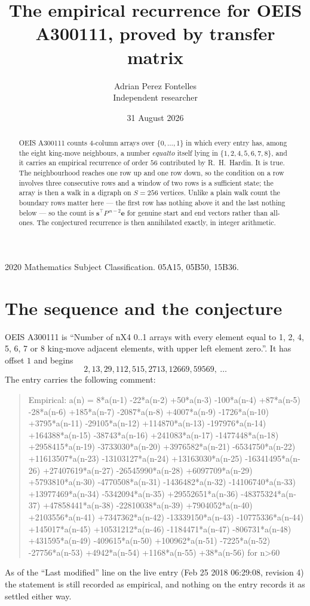 \documentclass[11pt,a4paper]{article}
\title{The empirical recurrence for OEIS A300111, proved by transfer matrix}
\author{Adrian Perez Fontelles\\ \small Independent researcher}
\date{31 August 2026}
\theoremstyle{plain}
\theoremstyle{definition}
\begin{document}
\maketitle

\begin{abstract}
OEIS A300111 counts $4$-column arrays over $\{0,\dots,1\}$ in which every entry has,
among the eight king-move neighbours, a number $equal to$ itself lying in $\{1,2,4,5,6,7,8\}$, and it carries an empirical
recurrence of order $56$ contributed by R.~H.~Hardin. It is true. The neighbourhood
reaches one row up and one row down, so the condition on a row involves three consecutive
rows and a window of two rows is a sufficient state; the array is then a walk in a digraph
on $S=256$ vertices. Unlike a plain walk count the boundary rows matter here --- the first
row has nothing above it and the last nothing below --- so the count is
$\mathbf{s}^{\!\top}P^{\,n-2}\mathbf{e}$ for genuine start and end vectors rather than
all-ones. The conjectured recurrence is then annihilated exactly, in integer arithmetic.
\end{abstract}

\noindent\small 2020 Mathematics Subject Classification. 05A15, 05B50, 15B36.\normalsize

\section{The sequence and the conjecture}

OEIS A300111 is ``Number of nX4 0..1 arrays with every element equal to 1, 2, 4, 5, 6, 7 or 8 king-move adjacent elements, with upper left element zero.''. It has offset
$1$ and begins
\[
2, 13, 29, 112, 515, 2713, 12669, 59569,\ \dots
\]
The entry carries the following comment:
\begin{quote}\small
Empirical: a(n) = 8*a(n-1) -22*a(n-2) +50*a(n-3) -100*a(n-4) +87*a(n-5) -28*a(n-6) +185*a(n-7) -2087*a(n-8) +4007*a(n-9) -1726*a(n-10) +3795*a(n-11) -29105*a(n-12) +114870*a(n-13) -197976*a(n-14) +164388*a(n-15) -38743*a(n-16) +241083*a(n-17) -1477448*a(n-18) +2958415*a(n-19) -3733030*a(n-20) +3976582*a(n-21) -6534750*a(n-22) +11613507*a(n-23) -13103127*a(n-24) +13163030*a(n-25) -16341495*a(n-26) +27407619*a(n-27) -26545990*a(n-28) +6097709*a(n-29) +5793810*a(n-30) -4770508*a(n-31) -1436482*a(n-32) -14106740*a(n-33) +13977469*a(n-34) -5342094*a(n-35) +29552651*a(n-36) -48375324*a(n-37) +47858441*a(n-38) -22810038*a(n-39) +7904052*a(n-40) +2103556*a(n-41) +7347362*a(n-42) -13339150*a(n-43) -10775336*a(n-44) +145017*a(n-45) +10531212*a(n-46) -1184471*a(n-47) -806731*a(n-48) +431595*a(n-49) -409615*a(n-50) +100962*a(n-51) -7225*a(n-52) -27756*a(n-53) +4942*a(n-54) +1168*a(n-55) +38*a(n-56) for n>60
\end{quote}
As of the ``Last modified'' line on the live entry (Feb 25 2018 06:29:08, revision
4) the statement is still recorded as empirical, and nothing on the entry
records it as settled either way.
\end{document}
